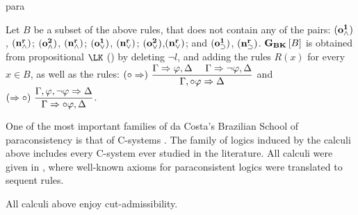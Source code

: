 \begin{entry}{para}
 \begin{clarifications}
Let $B$ be a subset of the above rules, that does not contain any of the
 pairs:
${\bf (o^1_\wedge)}$, ${\bf (n^r_\wedge)}$;
${\bf (o^2_\wedge)}$, ${\bf (n^r_\wedge)}$;
${\bf (o^1_\vee)}$, ${\bf (n^r_\vee)}$;
${\bf (o^2_\vee)}$,${\bf (n^r_\vee)}$; and
${\bf (o^1_\supset)}$, ${\bf (n^r_\supset)}$.
${{\bf G}_{\bf BK}}\left[B\right]$ is obtained from  propositional
 $\LK$ () by deleting
$\neg l$,
 and
 adding the rules $R(x)$ for every $x\in B$, as well as the rules:
\footnotesize$
(\circ\Rightarrow)~\dfrac{\Gamma\Rightarrow\varphi,\Delta~~~~ \Gamma\Rightarrow\neg\varphi,\Delta}{\Gamma,\circ\varphi\Rightarrow\Delta} $
\normalsize and \footnotesize
$(\Rightarrow\circ)~\dfrac{\Gamma,\varphi,\neg\varphi\Rightarrow\Delta}{\Gamma\Rightarrow\circ\varphi,\Delta}
$.
 \end{clarifications}

 \begin{history}
One of the most important families of da Costa's Brazilian School
of paraconsistency is that of
C-systems \cite{car:jmar:Taxonomy}.
The family of logics induced by the calculi above includes
every C-system ever studied in the literature.
All calculi were given in \cite{Avron2015},
where well-known axioms for paraconsistent logics were translated to sequent rules.
 \end{history}

 \begin{technicalities}
All calculi above enjoy cut-admissibility.
 \end{technicalities}



%
%
%
%
%
%
%
%




\end{entry}

